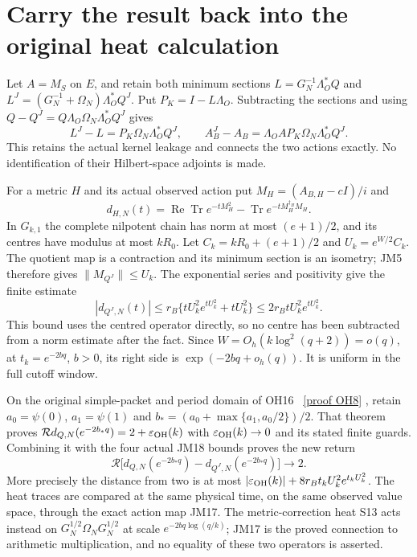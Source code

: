 \documentclass[11pt]{article}
\begin{document}
\section{Carry the result back into the original heat calculation}
Let $A=M_S$ on $E$, and retain both minimum sections
$L=G_N^{-1}\Lambda_O^*Q$ and
$L^J=(G_N^{-1}+\Omega_N)\Lambda_O^*Q^J$.
Put $P_K=I-L\Lambda_O$. Subtracting the sections and using
$Q-Q^J=Q\Lambda_O\Omega_N\Lambda_O^*Q^J$ gives
\[
 L^J-L=P_K\Omega_N\Lambda_O^*Q^J,\qquad
 A_B^J-A_B=\Lambda_OAP_K\Omega_N\Lambda_O^*Q^J.
 \tag{JM17}
\]
This retains the actual kernel leakage and connects the two actions
exactly. No identification of their Hilbert-space adjoints is made.

For a metric $H$ and its actual observed action put
$M_H=(A_{B,H}-cI)/i$ and
\[
 d_{H,N}(t)=\operatorname{Re}\operatorname{Tr}e^{-tM_H^2}
            -\operatorname{Tr}e^{-tM_H^{\dagger_H}M_H}.
\]
In $G_{k,1}$ the complete nilpotent chain has norm at most
$(e+1)/2$, and its centres have modulus at most $kR_0$.
Let $C_k=kR_0+(e+1)/2$ and $U_k=e^{W/2}C_k$.
The quotient map is a contraction and its minimum section is an
isometry; JM5 therefore gives $\|M_{Q^J}\|\le U_k$.
The exponential series and positivity give the finite estimate
\[
 |d_{Q^J,N}(t)|\le r_B\{tU_k^2e^{tU_k^2}+tU_k^2\}
 \le2r_BtU_k^2e^{tU_k^2}.\tag{JM18}
\]
This bound uses the centred operator directly, so no centre has been
subtracted from a norm estimate after the fact. Since
$W=O_h(k\log^2(q+2))=o(q)$, at $t_k=e^{-2bq}$, $b>0$, its right
side is $\exp(-2bq+o_h(q))$. It is uniform in the full cutoff window.

On the original simple-packet and period domain of OH16 \cite{OH}%
~\href{https://github.com/KokunoYumeto/zeta-function-research-reader/blob/main/workbenches/splitzero-tandem/continuations/20260921-kernel-degree-steps/providers/OBSERVATION_COMPLETE_PROOFS.tex\#L305}{[proof OH8]}%
{},
retain $a_0=\psi(0)$, $a_1=\psi(1)$ and
$b_*=(a_0+\max\{a_1,a_0/2\})/2$.
That theorem proves
$\mathcal R d_{Q,N}(e^{-2b_*q})=2+\varepsilon_{\rm OH}(k)$ with
$\varepsilon_{\rm OH}(k)\to0$ and its stated finite guards.
Combining it with the four actual JM18 bounds proves the new return
\[
 \boxed{\mathcal R\bigl[d_{Q,N}(e^{-2b_*q})
 -d_{Q^J,N}(e^{-2b_*q})\bigr]\longrightarrow2.}\tag{JM19}
\]
More precisely the distance from two is at most
$|\varepsilon_{\rm OH}(k)|+8r_Bt_kU_k^2e^{t_kU_k^2}$.
The heat traces are compared at the same physical time, on the same
observed value space, through the exact action map JM17.
The metric-correction heat S13 acts instead on
$G_N^{1/2}\Omega_NG_N^{1/2}$ at scale $e^{-2bq\log(q/k)}$;
JM17 is the proved connection to arithmetic multiplication, and no
equality of these two operators is asserted.
\end{document}
